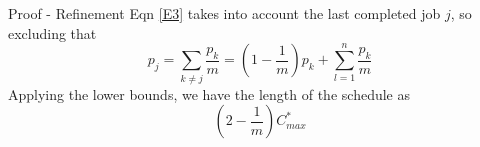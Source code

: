 \documentclass[aspectratio=169,xcolor=dvipsnames, t]{beamer}
\begin{document}
\begin{frame}{Proof - Refinement}
        Eqn \eqref{E3} takes into account the last completed job $j$, so excluding that \newline \newline \pause
        $$p_j = \sum_{k \ne j}  \frac{p_k}{m}=(1-\frac{1}{m})p_k+\sum_{l=1}^n \frac{p_k}{m}$$ \pause
        Applying the lower bounds, we have the length of the schedule as $$(2-\frac{1}{m})C_{max}^*$$
\end{frame}

\makefinalpage
\end{document}

